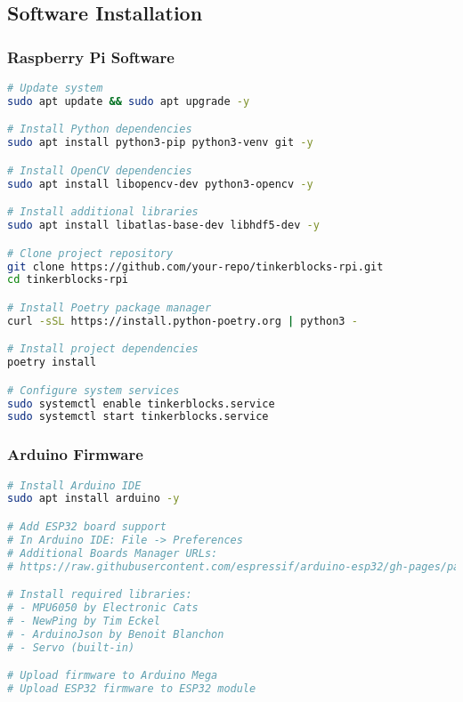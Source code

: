 \subsection{Software Installation}

\subsubsection{Raspberry Pi Software}

\begin{lstlisting}[language=bash,caption=Raspberry Pi Installation Commands]
# Update system
sudo apt update && sudo apt upgrade -y

# Install Python dependencies
sudo apt install python3-pip python3-venv git -y

# Install OpenCV dependencies
sudo apt install libopencv-dev python3-opencv -y

# Install additional libraries
sudo apt install libatlas-base-dev libhdf5-dev -y

# Clone project repository
git clone https://github.com/your-repo/tinkerblocks-rpi.git
cd tinkerblocks-rpi

# Install Poetry package manager
curl -sSL https://install.python-poetry.org | python3 -

# Install project dependencies
poetry install

# Configure system services
sudo systemctl enable tinkerblocks.service
sudo systemctl start tinkerblocks.service
\end{lstlisting}

\subsubsection{Arduino Firmware}

\begin{lstlisting}[language=bash,caption=Arduino IDE Setup]
# Install Arduino IDE
sudo apt install arduino -y

# Add ESP32 board support
# In Arduino IDE: File -> Preferences
# Additional Boards Manager URLs:
# https://raw.githubusercontent.com/espressif/arduino-esp32/gh-pages/package_esp32_index.json

# Install required libraries:
# - MPU6050 by Electronic Cats
# - NewPing by Tim Eckel
# - ArduinoJson by Benoit Blanchon
# - Servo (built-in)

# Upload firmware to Arduino Mega
# Upload ESP32 firmware to ESP32 module
\end{lstlisting}

